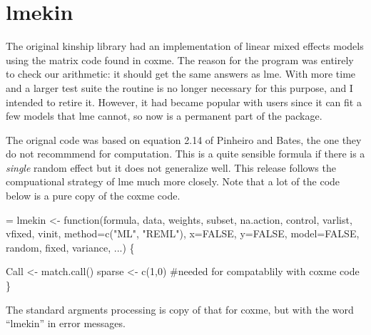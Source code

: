\documentclass{article}
\begin{document}
\section{lmekin}
The original kinship library had an implementation of linear mixed effects
models using the matrix code found in coxme.  
The reason for the program was entirely to check our arithmetic: it should
get the same answers as lme.
With more time and a larger test suite the routine is no longer 
necessary for this purpose, and I intended to retire it.
However, it had became popular with 
users since it can fit a few models that lme cannot, so now is a permanent
part of the package.

The orignal code was based on equation 2.14 of Pinheiro and Bates, the one
they do not recommmend for computation.
This is a quite sensible formula if there is a \emph{single}
random effect but it does not generalize well.
This release follows the compuational strategy of lme much more closely.
Note that a lot of the code below is a pure copy of the coxme code.

\begin{nwchunk}
=
 lmekin <- function(formula,  data, 
         weights, subset, na.action,
         control, varlist, vfixed, vinit, 
         method=c("ML", "REML"),
         x=FALSE, y=FALSE, model=FALSE,
         random, fixed, variance,  ...) \{
 
     Call <- match.call()
     sparse <- c(1,0)  #needed for compatablily with coxme code
     \}
\end{nwchunk}

The standard argments processing is copy of that for coxme, but with
the word ``lmekin'' in error messages.
\end{document}
